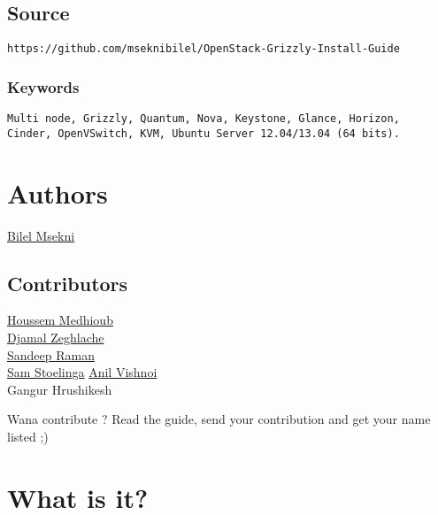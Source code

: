 
\def\quotelanguage{english}
\def\latexmode{memoire}
\def\mytitle{OpenStack Install Documentation}
\def\myauthor{Bilel Msekni}

\subsection{Source}
\label{source}

\begin{verbatim}
https://github.com/mseknibilel/OpenStack-Grizzly-Install-Guide
\end{verbatim}


\subsubsection{Keywords}
\label{keywords}

\begin{verbatim}
Multi node, Grizzly, Quantum, Nova, Keystone, Glance, Horizon,
Cinder, OpenVSwitch, KVM, Ubuntu Server 12.04/13.04 (64 bits).
\end{verbatim}


\section{Authors}
\label{authors}

\href{http://www.linkedin.com/profile/view?id=136237741&trk=tab_pro}{Bilel Msekni}

\subsection{Contributors}
\label{contributors}

\href{houssem.medhioub@it-sudparis.eu}{Houssem Medhioub}\\
\href{djamal.zeghlache@telecom-sudparis.eu}{Djamal Zeghlache}\\
\href{sandeepr@hp.com}{Sandeep Raman}\\
\href{sammiestoel@gmail.com}{Sam Stoelinga}
\href{vishnoianil@gmail.com}{Anil Vishnoi}\\
Gangur Hrushikesh

Wana contribute ? Read the guide, send your contribution and get your name listed ;)

\section{What is it?}
\label{whatisit}

